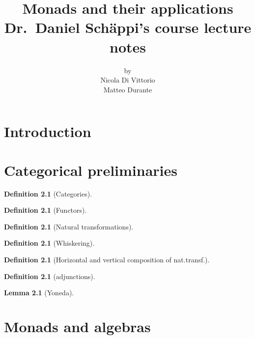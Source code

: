 \documentclass[a4paper,11pt,twoside, openany]{book}
\theoremstyle{definition}
\theoremstyle{definition}
\newtheorem{defn}[thm]{Definition} %
\newtheorem{lemma}[thm]{Lemma}
\theoremstyle{remark}
\begin{document}
\author{by \\
	Nicola Di Vittorio \\ Matteo Durante}
\title{\huge Monads and their applications \\
	\vspace*{5mm}
\large Dr.\ Daniel Schäppi's course lecture notes} 
\date{}

\frontmatter
\maketitle
\tableofcontents

\chapter{Introduction}

\mainmatter

\chapter{Categorical preliminaries}
\begin{defn}[Categories]
	
\end{defn}

\begin{defn}[Functors]
	
\end{defn}

\begin{defn}[Natural transformations]

\end{defn}

\begin{defn}[Whiskering]
	
\end{defn}

\begin{defn}[Horizontal and vertical composition of nat.transf.]
	
\end{defn}

\begin{defn}[adjunctions]
	
\end{defn}



\begin{lemma}[Yoneda]
	
\end{lemma}


\chapter{Monads and algebras}
\end{document}
